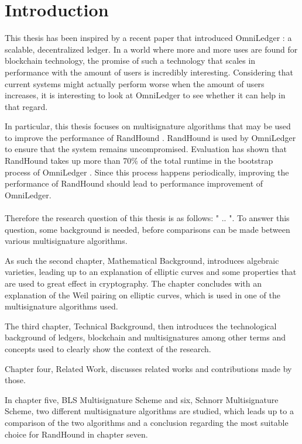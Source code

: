\chapter{Introduction}
This thesis has been inspired by a recent paper that introduced OmniLedger \cite{OmniLedger}: a scalable, decentralized ledger. In a world where more and more uses are found for blockchain technology, the promise of such a technology that scales in performance with the amount of users is incredibly interesting. Considering that current systems might actually perform worse when the amount of users increases, it is interesting to look at OmniLedger to see whether it can help in that regard.

In particular, this thesis focuses on multisignature algorithms that may be used to improve the performance of RandHound \cite{RandHound}. RandHound is used by OmniLedger to ensure that the system remains uncompromised. Evaluation has shown that RandHound takes up more than 70\% of the total runtime in the bootstrap process of OmniLedger \cite{OmniLedger}. Since this process happens periodically, improving the performance of RandHound should lead to performance improvement of OmniLedger.
\\
\\
Therefore the research question of this thesis is as follows: " .. ". To answer this question, some background is needed, before comparisons can be made between various multisignature algorithms.

As such the second chapter, Mathematical Background, introduces algebraic varieties, leading up to an explanation of elliptic curves and some properties that are used to great effect in cryptography. The chapter concludes with an explanation of the Weil pairing on elliptic curves, which is used in one of the multisignature algorithms used.

The third chapter, Technical Background, then introduces the technological background of ledgers, blockchain and multisignatures among other terms and concepts used to clearly show the context of the research.

Chapter four, Related Work, discusses related works and contributions made by those.

In chapter five, BLS Multisignature Scheme and six, Schnorr Multisignature Scheme, two different multisignature algorithms are studied, which leads up to a comparison of the two algorithms and a conclusion regarding the most suitable choice for RandHound in chapter seven.